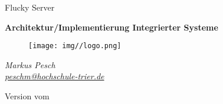 \begin{titlepage}
  \begin{center}
    \begin{large}
      Flucky Server
    \end{large}

    \begin{huge}
      \begin{singlespace}
            \textbf{Architektur/Implementierung Integrierter Systeme}
      \end{singlespace}
    \end{huge}

    \vspace{0.5cm}

    \begin{figure}[h]
      \centering
      \texttt{[image: img//logo.png]}
      \label{img:fh-trier-logo}
    \end{figure}

    \vspace{2cm}
    \begin{large}
      \textit{Markus Pesch} \\
      \href{mailto:peschm@hochschule-trier.de}{\textit{peschm@hochschule-trier.de}}
    \end{large}
    \vspace{2cm}

    Version  vom 

  \end{center}
\end{titlepage}
